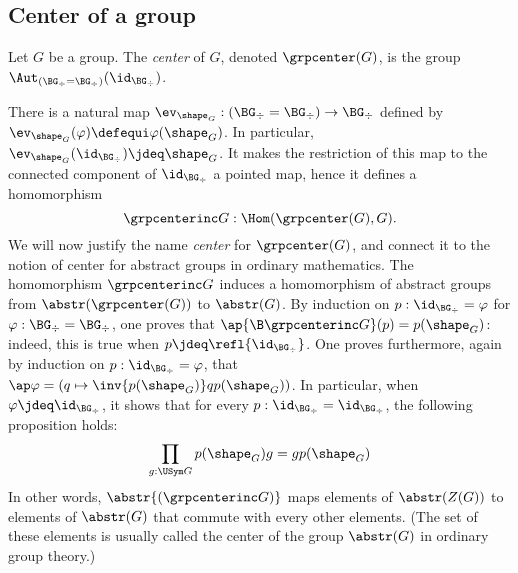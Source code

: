 \subsection{Center of a group}
\label{sec:center-group}

\begin{definition}
  Let $G$ be a group. The {\em center} of $G$, denoted
  $\grpcenter(G)$, is the group
  $\Aut_{(\BG_\div=\BG_\div)}(\id_{\BG_\div})$.%
\end{definition}

There is a natural map
$\ev_{\shape_G} : (\BG_\div=\BG_\div) \to \BG_\div$ defined by
$\ev_{\shape_G}(\varphi)\defequi \varphi(\shape_G)$. In particular,
$\ev_{\shape_G}(\id_{\BG_\div}) \jdeq \shape_G$. It makes the restriction
of this map to the connected component of $\id_{\BG_\div}$ a
pointed map, hence it defines a homomorphism
\begin{displaymath}
  \grpcenterinc G : \Hom(\grpcenter(G), G).
\end{displaymath}
We will now justify the name {\em center} for $\grpcenter(G)$, and
connect it to the notion of center for abstract groups in ordinary
mathematics. The homomorphism $\grpcenterinc G$ induces a homomorphism
of abstract groups from $\abstr(\grpcenter(G))$ to $\abstr(G)$. By
induction on $p:\id_{\BG_\div} = \varphi$ for
$\varphi:\BG_\div=\BG_\div$, one proves that
$\ap{\B \grpcenterinc G}(p) = p(\shape_G)$: indeed, this is true when
$p\jdeq \refl {\id_{\BG_\div}}$. One proves furthermore, again by
induction on $p:\id_{\BG_\div} = \varphi$, that
$\ap \varphi = (q\mapsto \inv{p(\shape_G)} q p(\shape_G))$. In particular,
when $\varphi \jdeq \id_{\BG_\div}$, it shows that for every
$p:\id_{\BG_\div}=\id_{\BG_\div}$, the following proposition
holds:
\begin{displaymath}
  \prod_{g:\USym G }p(\shape_G) g = g p(\shape_G)
\end{displaymath}
In other words, $\abstr{(\grpcenterinc G)}$ maps elements of
$\abstr(Z(G))$ to elements of $\abstr(G)$ that commute with every
other elements. (The set of these elements is usually called the
center of the group $\abstr(G)$ in ordinary group theory.)

